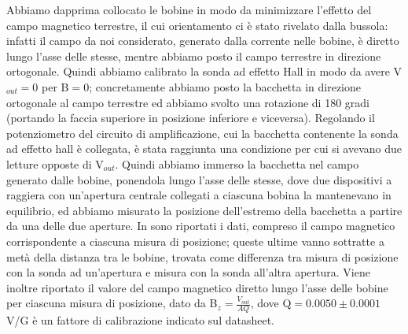 Abbiamo dapprima collocato le bobine in modo da minimizzare l'effetto del campo magnetico terrestre, il cui orientamento ci è stato rivelato dalla bussola: infatti il campo da noi considerato, generato dalla corrente nelle bobine, è diretto lungo l'asse delle stesse, mentre abbiamo posto il campo terrestre in direzione ortogonale. Quindi abbiamo calibrato la sonda ad effetto Hall in modo da avere V$_{out}=0$ per B$=0$; concretamente abbiamo posto la bacchetta in direzione ortogonale al campo terrestre ed abbiamo svolto una rotazione di 180 gradi (portando la faccia superiore in posizione inferiore e viceversa). Regolando il potenziometro del circuito di amplificazione, cui la bacchetta contenente la sonda ad effetto hall è collegata, è stata raggiunta una condizione per cui si avevano due letture opposte di V$_{out}$.
Quindi abbiamo immerso la bacchetta nel campo generato dalle bobine, ponendola lungo l'asse delle stesse, dove due dispositivi a raggiera con un'apertura centrale collegati a ciascuna bobina la mantenevano in equilibrio, ed abbiamo misurato la posizione dell'estremo della bacchetta a partire da una delle due aperture. In  sono riportati i dati, compreso il campo magnetico corrispondente a ciascuna misura di posizione; queste ultime vanno sottratte a metà della distanza tra le bobine, trovata come differenza tra misura di posizione con la sonda ad un'apertura e misura con la sonda all'altra apertura. Viene inoltre riportato il valore del campo magnetico diretto lungo l'asse delle bobine per ciascuna misura di posizione, dato da B$_z = \frac{V_{out}}{AQ}$, dove Q$=0.0050 \pm 0.0001$ V/G è un fattore di calibrazione indicato sul datasheet.
